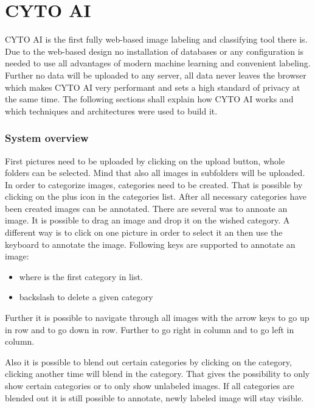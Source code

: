 \chapter{CYTO AI}
CYTO AI is the first fully web-based image labeling and classifying tool there is. Due to the web-based design no installation of databases or any configuration is needed to use all advantages of modern machine learning and convenient labeling. Further no data will be uploaded to any server, all data never leaves the browser which makes CYTO AI very performant and sets a high standard of privacy at the same time. The following sections shall explain how CYTO AI works and which techniques and architectures were used to build it.

\subsection{System overview}
First pictures need to be uploaded by clicking on the upload button, whole folders can be selected. Mind that also all images in subfolders will be uploaded. In order to categorize images, categories need to be created. That is possible by clicking on the plus icon in the categories list. After all necessary categories have been created images can be annotated. There are several was to annoate an image. It is possible to drag an image and drop it on the wished category. A different way is to click on one picture in order to select it an then use the keyboard to annotate the image. Following keys are supported to annotate an image:

\begin{itemize}
	\item {}      
	   where  is the first category in list.
	\item \keystroke{$\Leftarrow$} backslash to delete a given category
\end{itemize}

Further it is possible to navigate through all images with the arrow keys \keystroke{$\Uparrow$} to go up in row and 
 \keystroke{$\Downarrow$} to go down in row. Further \keystroke{$\Rightarrow$} to go right in column and \keystroke{$\Leftarrow$} to go left in column.


Also it is possible to blend out certain categories by clicking on the category, clicking another time will blend in the category. That gives the possibility to only show certain categories or to only show unlabeled images.
If all categories are blended out it is still possible to annotate, newly labeled image will stay visible.

